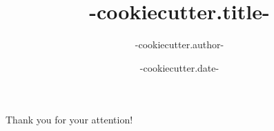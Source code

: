 \documentclass[table,10pt,aspectratio=169,compress,xcolor={table,usenames,dvipsnames,x11names,svgnames},hyperref={unicode,hidelinks}]{beamer}
\author[{{cookiecutter.author_short}}]{ {{-cookiecutter.author-}} }
\title[{{cookiecutter.title_short}}]{ {{-cookiecutter.title-}} }
\institute[{{cookiecutter.institute_short}}]{ {{-cookiecutter.institute-}} }
\date{ {{-cookiecutter.date-}} }
\begin{document}

\newcommand{\TalkVersion}{v0}


\begin{backupslides}[5mm]{\alert{\huge Thank you for your attention!}}
\end{backupslides}
\end{document}

